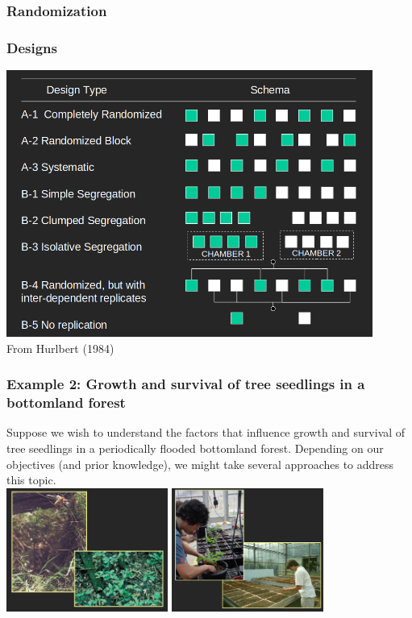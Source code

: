 \documentclass[color=usenames,dvipsnames]{beamer}\usepackage[]{graphicx}\usepackage[]{color}
\begin{document}
\begin{frame}
  \frametitle{Randomization}
  
\end{frame}



\begin{frame}
  \frametitle{Designs}
  \centering
  \includegraphics[width=0.9\textwidth]{Hurlbert-schema} \\
  From Hurlbert (1984) \\
\end{frame}



\begin{frame}
  \frametitle{Example 2: Growth and survival of
    tree seedlings in a bottomland forest}
  Suppose we wish to understand the factors that influence growth and
  survival of tree seedlings in a periodically flooded bottomland
  forest.  Depending on our objectives (and prior knowledge), we might
  take several approaches to address this topic. \\
  \vfill
  \includegraphics[height=1.6in]{seedlings-obs} \hfill
  \includegraphics[height=1.6in]{seedlings-exp} 
\end{frame}
\end{document}
